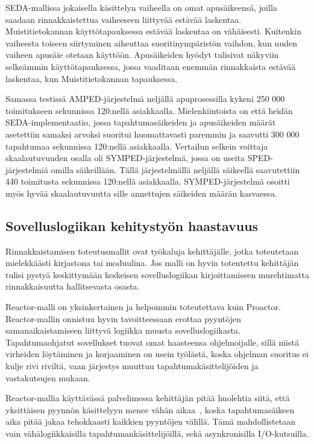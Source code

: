 \documentclass[finnish]{tktltiki2}
\theoremstyle{definition}
\theoremstyle{remark}
\begin{document}
SEDA-mallissa jokaisella käsittelyn vaiheella on omat apusäikeensä,
joilla saadaan rinnakkaistettua vaiheeseen liittyvää estävää laskentaa. 
Muistitietokannan käyttötapauksessa estävää laskentaa on vähäisesti.
Kuitenkin vaiheesta toiseen siirtyminen aiheuttaa suoritinympäristön vaihdon,
kun uuden vaiheen apusäie otetaan käyttöön. 
Apusäikeiden hyödyt
tulisivat näkyviin selkeämmin käyttötapauksessa, jossa vaaditaan enemmän
rinnakkaista estävää laskentaa, kun Muistitietokannan tapauksessa. 

Samassa testissä AMPED-järjestelmä neljällä apuprosessilla
kykeni 250 000 toimitukseen sekunnissa 120:nellä asiakkaalla. Mielenkiintoista on
että heidän SEDA-implementaatio, jossa tapahtumasäikeiden ja apusäikeiden
määrät asetettiin samaksi arvoksi suoritui huomattavasti paremmin ja
saavutti 300 000 tapahtumaa sekunnissa 120:nellä asiakkaalla.
Vertailun selkein voittaja skaalautuvuuden
osalla oli SYMPED-järjestelmä, jossa on useita SPED-järjestelmiä
omilla säikeillään. Tällä järjestelmällä neljällä säikeellä
saavutettiin 440 toimitusta sekunnissa 120:nellä asiakkaalla.
SYMPED-järjestelmä osoitti myös hyvää skaalautuvuutta 
sille annettujen säikeiden määrän kasvaessa.


\subsection{Sovelluslogiikan kehitystyön haastavuus}
Rinnakkaistamisen toteutusmallit ovat työkaluja kehittäjälle,
jotka toteutetaan mielekkäästi kirjastona tai moduulina.
Jos malli on hyvin toteutettu kehittäjän tulisi pystyä
keskittymään keskeisen sovelluslogiikan kirjoittamiseen 
murehtimatta rinnakkaisuutta hallitsevasta osasta.

Reactor-malli on yksinkertainen ja helpommin toteutettava
kuin Proactor. Reactor-mallin onnistuu hyvin tavoitteessaan
erottaa pyyntöjen samanaikaistamiseen liittyvä logiikka
muusta sovelluslogiikasta.
Tapahtumaohjatut sovellukset tuovat omat haasteensa
ohjelmoijalle, sillä niistä virheiden löytäminen ja
korjaaminen on usein työlästä, koska ohjelman
suoritus ei kulje rivi riviltä, vaan järjestys
muuttuu tapahtumakäsittelijöiden ja vastakutsujen mukaan.

Reactor-mallia käyttävässä palvelimessa kehittäjän
pitää huolehtia siitä, että yksittäisen pyynnön
käsittelyyn menee vähän aikaa~\cite{pyarali_proactor_1997}, koska
tapahtumasäikeen aika pitää jakaa tehokkaasti
kaikkien pyyntöjen välillä. Tämä mahdollistetaan
vain vähälogiikkaisilla tapahtumankäsittelijöillä, sekä
asynkronisilla I/O-kutsuilla.
\end{document}
